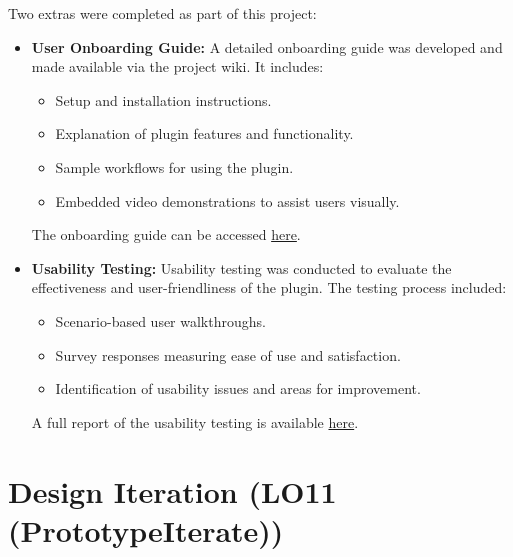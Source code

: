 \documentclass{article}
\begin{document}
Two extras were completed as part of this project:

\begin{itemize}
    \item \textbf{User Onboarding Guide:}  
    A detailed onboarding guide was developed and made available via the project wiki. It includes:
    \begin{itemize}
        \item Setup and installation instructions.
        \item Explanation of plugin features and functionality.
        \item Sample workflows for using the plugin.
        \item Embedded video demonstrations to assist users visually.
    \end{itemize}
    The onboarding guide can be accessed \href{https://github.com/ssm-lab/capstone--sco-vs-code-plugin/wiki}{here}.


    \item \textbf{Usability Testing:}  
    Usability testing was conducted to evaluate the effectiveness and user-friendliness of the plugin. The testing process included:
    \begin{itemize}
        \item Scenario-based user walkthroughs.
        \item Survey responses measuring ease of use and satisfaction.
        \item Identification of usability issues and areas for improvement.
    \end{itemize}
        A full report of the usability testing is available \href{https://github.com/ssm-lab/capstone--source-code-optimizer/blob/main/docs/Extras/UsabilityTesting/UsabilityTestingReport.pdf}{here}.

\end{itemize}
\section{Design Iteration (LO11 (PrototypeIterate))}


\end{document}
